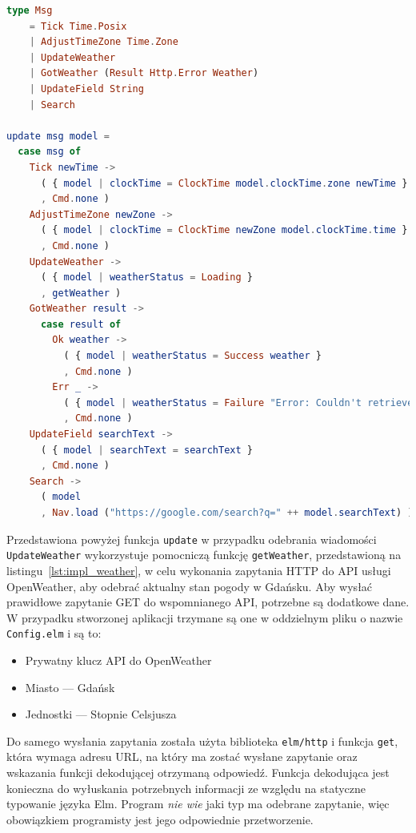 \documentclass[twoside,a4paper]{report}
\begin{document}
\begin{lstlisting}[caption={Implementacja typu \texttt{Msg} i funkcji \texttt{update}},label={lst:impl_update},language={Elm}]
type Msg
    = Tick Time.Posix
    | AdjustTimeZone Time.Zone
    | UpdateWeather
    | GotWeather (Result Http.Error Weather)
    | UpdateField String
    | Search

update msg model =
  case msg of
    Tick newTime ->
      ( { model | clockTime = ClockTime model.clockTime.zone newTime }
      , Cmd.none )
    AdjustTimeZone newZone ->
      ( { model | clockTime = ClockTime newZone model.clockTime.time }
      , Cmd.none )
    UpdateWeather ->
      ( { model | weatherStatus = Loading }
      , getWeather )
    GotWeather result ->
      case result of
        Ok weather ->
          ( { model | weatherStatus = Success weather }
          , Cmd.none )
        Err _ ->
          ( { model | weatherStatus = Failure "Error: Couldn't retrieve weather data" }
          , Cmd.none )
    UpdateField searchText ->
      ( { model | searchText = searchText }
      , Cmd.none )
    Search ->
      ( model
      , Nav.load ("https://google.com/search?q=" ++ model.searchText) )
\end{lstlisting}

Przedstawiona powyżej funkcja \texttt{update} w przypadku odebrania wiadomości \texttt{UpdateWeather} wykorzystuje pomocniczą funkcję \texttt{getWeather}, przedstawioną na listingu~\ref{lst:impl_weather}, w celu wykonania zapytania HTTP do API usługi OpenWeather, aby odebrać aktualny stan pogody w Gdańsku.
Aby wysłać prawidłowe zapytanie GET do wspomnianego API, potrzebne są dodatkowe dane.
W przypadku stworzonej aplikacji trzymane są one w oddzielnym pliku o nazwie \texttt{Config.elm} i są to:
\begin{itemize}[noitemsep,topsep=0pt]
    \item Prywatny klucz API do OpenWeather
    \item Miasto --- Gdańsk
    \item Jednostki --- Stopnie Celsjusza
\end{itemize}

Do samego wysłania zapytania została użyta biblioteka \texttt{elm/http} i funkcja \texttt{get}, która wymaga adresu URL, na który ma zostać wysłane zapytanie oraz wskazania funkcji dekodującej otrzymaną odpowiedź.
Funkcja dekodująca jest konieczna do wyłuskania potrzebnych informacji ze względu na statyczne typowanie języka Elm.
Program \textit{nie wie} jaki typ ma odebrane zapytanie, więc obowiązkiem programisty jest jego odpowiednie przetworzenie.
\end{document}

